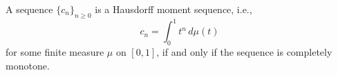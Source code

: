 A sequence \(\{c_n\}_{n \geq 0}\) is a Hausdorff moment sequence, i.e.,
\[
c_n = \int_0^1 t^n \, d\mu(t)
\]
for some finite measure \(\mu\) on \([0,1]\), if and only if the sequence is completely monotone.
